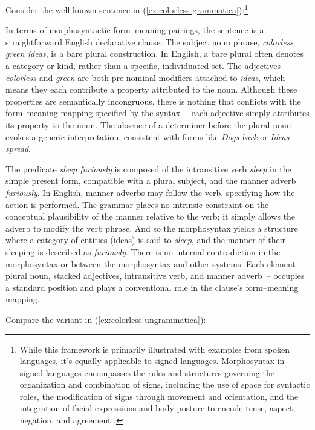 \bigskip
Consider the well-known sentence in (\ref{ex:colorless-grammatica}):\footnote{While this framework is primarily illustrated with examples from spoken languages, it's equally applicable to signed languages. Morphosyntax in signed languages encompasses the rules and structures governing the organization and combination of signs, including the use of space for syntactic roles, the modification of signs through movement and orientation, and the integration of facial expressions and body posture to encode tense, aspect, negation, and agreement \autocite{Quer2019}.}

\label{ex:colorless-grammatica}
\z
In terms of morphosyntactic form--meaning pairings, the sentence is a straightforward English declarative clause. The subject noun phrase, \textit{colorless green ideas}, is a bare plural construction. In English, a bare plural often denotes a category or kind, rather than a specific, individuated set. The adjectives \textit{colorless} and \textit{green} are both pre-nominal modifiers attached to \textit{ideas}, which means they each contribute a property attributed to the noun. Although these properties are semantically incongruous, there is nothing that conflicts with the form--meaning mapping specified by the syntax~-- each adjective simply attributes its property to the noun. The absence of a determiner before the plural noun evokes a generic interpretation, consistent with forms like \textit{Dogs bark} or \textit{Ideas spread}.

The predicate \textit{sleep furiously} is composed of the intransitive verb \textit{sleep} in the simple present form, compatible with a plural subject, and the manner adverb \textit{furiously}. In English, manner adverbs may follow the verb, specifying how the action is performed. The grammar places no intrinsic constraint on the conceptual plausibility of the manner relative to the verb; it simply allows the adverb to modify the verb phrase. And so the morphosyntax yields a structure where a category of entities (ideas) is said to \textit{sleep}, and the manner of their sleeping is described as \textit{furiously}. There is no internal contradiction in the morphosyntax or between the morphosyntax and other systems. Each element~-- plural noun, stacked adjectives, intransitive verb, and manner adverb~-- occupies a standard position and plays a conventional role in the clause’s form--meaning mapping.

Compare the variant in (\ref{ex:colorless-ungrammatica}):
\label{ex:colorless-ungrammatica}
\z

